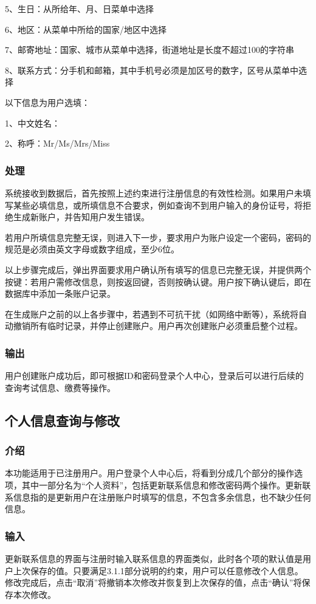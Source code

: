 5、生日：从所给年、月、日菜单中选择

6、地区：从菜单中所给的国家/地区中选择

7、邮寄地址：国家、城市从菜单中选择，街道地址是长度不超过100的字符串

8、联系方式：分手机和邮箱，其中手机号必须是加区号的数字，区号从菜单中选择

以下信息为用户选填：

1、中文姓名：

2、称呼：Mr/Ms/Mrs/Miss

\subsubsection{处理}
系统接收到数据后，首先按照上述约束进行注册信息的有效性检测。如果用户未填写某些必填信息，或所填信息不合要求，例如查询不到用户输入的身份证号，将拒绝生成新账户，并告知用户发生错误。

若用户所填信息完整无误，则进入下一步，要求用户为账户设定一个密码，密码的规范是必须由英文字母或数字组成，至少6位。

以上步骤完成后，弹出界面要求用户确认所有填写的信息已完整无误，并提供两个按键：若用户需修改信息，则按返回键，否则按确认键。用户按下确认键后，即在数据库中添加一条账户记录。

在生成账户之前的以上各步骤中，若遇到不可抗干扰（如网络中断等），系统将自动撤销所有临时记录，并停止创建账户。用户再次创建账户必须重启整个过程。

\subsubsection{输出}
用户创建账户成功后，即可根据ID和密码登录个人中心，登录后可以进行后续的查询考试信息、缴费等操作。

\subsection{个人信息查询与修改}

\subsubsection{介绍}
本功能适用于已注册用户。用户登录个人中心后，将看到分成几个部分的操作选项，其中一部分名为“个人资料”，包括更新联系信息和修改密码两个操作。更新联系信息指的是更新用户在注册账户时填写的信息，不包含多余信息，也不缺少任何信息。

\subsubsection{输入}
更新联系信息的界面与注册时输入联系信息的界面类似，此时各个项的默认值是用户上次保存的值。只要满足3.1.1部分说明的约束，用户可以任意修改个人信息。修改完成后，点击“取消”将撤销本次修改并恢复到上次保存的值，点击“确认”将保存本次修改。

